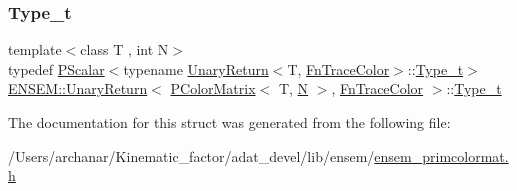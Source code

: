 \subsubsection{\texorpdfstring{Type\_t}{Type\_t}\hspace{0.1cm}{\footnotesize\ttfamily [2/2]}}
{\footnotesize\ttfamily template$<$class T , int N$>$ \\
typedef \mbox{\hyperlink{classENSEM_1_1PScalar}{P\+Scalar}}$<$typename \mbox{\hyperlink{structENSEM_1_1UnaryReturn}{Unary\+Return}}$<$T, \mbox{\hyperlink{structENSEM_1_1FnTraceColor}{Fn\+Trace\+Color}}$>$\+::\mbox{\hyperlink{structENSEM_1_1UnaryReturn_3_01PColorMatrix_3_01T_00_01N_01_4_00_01FnTraceColor_01_4_afd2c41bfcf24b11918ac3aa892d38881}{Type\+\_\+t}}$>$ \mbox{\hyperlink{structENSEM_1_1UnaryReturn}{E\+N\+S\+E\+M\+::\+Unary\+Return}}$<$ \mbox{\hyperlink{classENSEM_1_1PColorMatrix}{P\+Color\+Matrix}}$<$ T, \mbox{\hyperlink{operator__name__util_8cc_a7722c8ecbb62d99aee7ce68b1752f337}{N}} $>$, \mbox{\hyperlink{structENSEM_1_1FnTraceColor}{Fn\+Trace\+Color}} $>$\+::\mbox{\hyperlink{structENSEM_1_1UnaryReturn_3_01PColorMatrix_3_01T_00_01N_01_4_00_01FnTraceColor_01_4_afd2c41bfcf24b11918ac3aa892d38881}{Type\+\_\+t}}}



The documentation for this struct was generated from the following file\+:\begin{DoxyCompactItemize}
\item 
/\+Users/archanar/\+Kinematic\+\_\+factor/adat\+\_\+devel/lib/ensem/\mbox{\hyperlink{lib_2ensem_2ensem__primcolormat_8h}{ensem\+\_\+primcolormat.\+h}}\end{DoxyCompactItemize}
